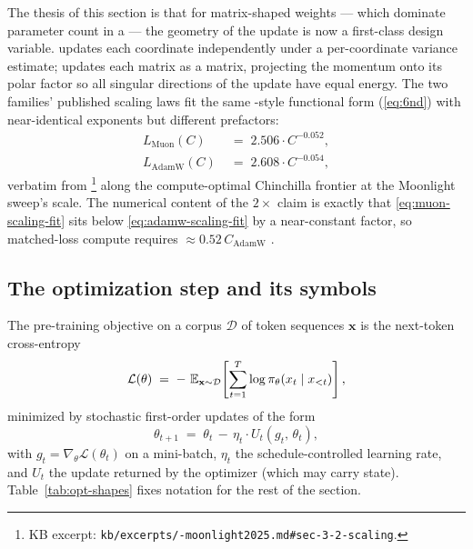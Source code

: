 The thesis of this section is that for matrix-shaped weights ---
which dominate parameter count in a  --- the geometry of
the update is now a first-class design variable.  updates each
coordinate independently under a per-coordinate variance estimate;
 updates each matrix as a matrix, projecting the momentum onto
its polar factor so all singular directions of the update have equal
energy. The two families' published scaling laws fit the same
\citet{kaplan2020}-style functional form (\cref{eq:6nd}) with
near-identical exponents but different prefactors:
\begin{align}
L_{\mathrm{Muon}}(C)  &\;=\; 2.506 \cdot C^{-0.052},
   \label{eq:muon-scaling-fit} \\
L_{\mathrm{AdamW}}(C) &\;=\; 2.608 \cdot C^{-0.054},
   \label{eq:adamw-scaling-fit}
\end{align}
verbatim from \citet[\S 3.2, Table 3]{muon-moonlight2025}\footnote{KB
excerpt: \texttt{kb/excerpts/-moonlight2025.md\#sec-3-2-scaling}.}
along the compute-optimal Chinchilla frontier at the Moonlight sweep's
scale. The numerical content of the $2\times$ claim is exactly that
\cref{eq:muon-scaling-fit} sits below \cref{eq:adamw-scaling-fit} by a
near-constant factor, so matched-loss compute requires
$\approx 0.52\,C_{\mathrm{AdamW}}$ \citep[Figure
1a]{muon-moonlight2025}.

\subsection{The optimization step and its symbols}
\label{sec:opt-setup}

The pre-training objective on a corpus $\mathcal{D}$ of token
sequences $\mathbf{x}$ is the next-token cross-entropy
\begin{equation}
\mathcal{L}(\theta) \;=\; -\,\operatorname{\mathbb{E}}_{\mathbf{x} \sim \mathcal{D}}\!\left[
   \sum_{t=1}^{T} \log \pi_\theta(x_t \mid x_{<t}) \right],
\label{eq:opt-pretrain-loss}
\end{equation}
minimized by stochastic first-order updates of the form
\begin{equation}
\theta_{t+1} \;=\; \theta_t \,-\, \eta_t \cdot U_t(g_t,\,\theta_t),
\label{eq:opt-step}
\end{equation}
with $g_t = \nabla_\theta \mathcal{L}(\theta_t)$ on a mini-batch,
$\eta_t$ the schedule-controlled learning rate, and $U_t$ the update
returned by the optimizer (which may carry state).
Table~\ref{tab:opt-shapes} fixes notation for the rest of the section.

